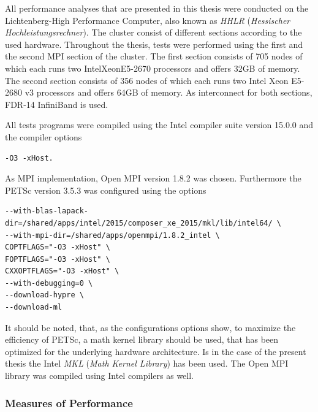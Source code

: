 All performance analyses that are presented in this thesis were conducted on the Lichtenberg-High Performance Computer, also known as \emph{HHLR} (\emph{Hessischer Hochleistungsrechner}). The cluster consist of different sections according to the used hardware. Throughout the thesis, tests were performed using the first and the second MPI section of the cluster. The first section consists of 705 nodes of which each runs two Intel\textregistered Xeon\textregistered E5-2670 processors and offers 32GB of memory. The second section consists of 356 nodes of which each runs two Intel Xeon E5-2680 v3 processors and offers 64GB of memory. As interconnect for both sections, FDR-14 InfiniBand is used.

All tests programs were compiled using the Intel compiler suite version 15.0.0 and the compiler options
\begin{lstlisting}
-O3 -xHost.
\end{lstlisting}
As MPI implementation, Open MPI version 1.8.2 was chosen. Furthermore the PETSc version 3.5.3 was configured using the options
\begin{lstlisting}
--with-blas-lapack-dir=/shared/apps/intel/2015/composer_xe_2015/mkl/lib/intel64/ \
--with-mpi-dir=/shared/apps/openmpi/1.8.2_intel \
COPTFLAGS="-O3 -xHost" \
FOPTFLAGS="-O3 -xHost" \
CXXOPTFLAGS="-O3 -xHost" \
--with-debugging=0 \
--download-hypre \
--download-ml
\end{lstlisting}
It should be noted, that, as the configurations options show, to maximize the efficiency of PETSc, a math kernel library should be used, that has been optimized for the underlying hardware architecture. Is in the case of the present thesis the Intel \emph{MKL} (\emph{Math Kernel Library}) has been used. The Open MPI library was compiled using Intel compilers as well.

\subsubsection{Measures of Performance}


